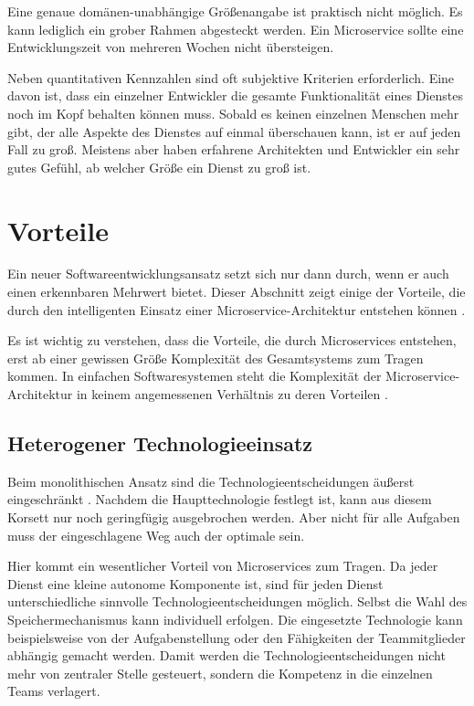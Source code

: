 Eine genaue domänen-unabhängige Größenangabe ist praktisch nicht möglich. Es kann lediglich ein grober Rahmen abgesteckt werden. Ein Microservice sollte eine Entwicklungszeit von mehreren Wochen nicht übersteigen.

Neben quantitativen Kennzahlen sind oft subjektive Kriterien erforderlich. Eine davon ist, dass ein einzelner Entwickler die gesamte Funktionalität eines Dienstes noch im Kopf behalten können muss. Sobald es keinen einzelnen Menschen mehr gibt, der alle Aspekte des Dienstes auf einmal überschauen kann, ist er auf jeden Fall zu groß. Meistens aber haben erfahrene Architekten und Entwickler ein sehr gutes Gefühl, ab welcher Größe ein Dienst zu groß ist.

\section{Vorteile}

Ein neuer Softwareentwicklungsansatz setzt sich nur dann durch, wenn er auch einen erkennbaren Mehrwert bietet. Dieser Abschnitt zeigt einige der Vorteile, die durch den intelligenten Einsatz einer Microservice-Architektur entstehen können \cite{fowlerMSTradeOffs,newman2015building}.

Es ist wichtig zu verstehen, dass die Vorteile, die durch Microservices entstehen, erst ab einer gewissen Größe \bzw Komplexität des Gesamtsystems zum Tragen kommen. In einfachen Softwaresystemen steht die Komplexität der Microservice-Architektur in keinem angemessenen Verhältnis zu deren Vorteilen \cite{fowlerMSPremium}.

\subsection{Heterogener Technologieeinsatz}

Beim monolithischen Ansatz sind die Technologieentscheidungen äußerst eingeschränkt \cite{fowlerMSTradeOffs}. Nachdem die Haupttechnologie festlegt ist, kann aus diesem Korsett nur noch geringfügig ausgebrochen werden. Aber nicht für alle Aufgaben muss der eingeschlagene Weg auch der optimale sein.

Hier kommt ein wesentlicher Vorteil von Microservices zum Tragen. Da jeder Dienst eine kleine autonome Komponente ist, sind für jeden Dienst unterschiedliche sinnvolle Technologieentscheidungen möglich. Selbst die Wahl des Speichermechanismus kann individuell erfolgen. Die eingesetzte Technologie kann beispielsweise von der Aufgabenstellung oder den Fähigkeiten der Teammitglieder abhängig gemacht werden. Damit werden die Technologieentscheidungen nicht mehr von zentraler Stelle gesteuert, sondern die Kompetenz in die einzelnen Teams verlagert.

